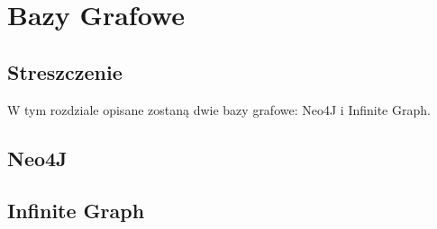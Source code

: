 \chapter{Bazy Grafowe}

\section*{Streszczenie}
W tym rozdziale opisane zostaną dwie bazy grafowe: Neo4J i Infinite Graph.

\section{Neo4J}
\label{sec:neo4j}

\section{Infinite Graph}
\label{sec:infinite_graph}